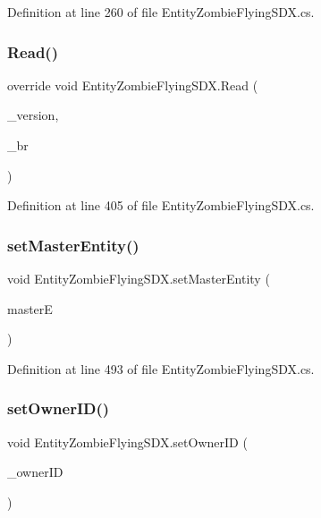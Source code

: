 Definition at line 260 of file Entity\+Zombie\+Flying\+S\+D\+X.\+cs.

\mbox{\label{class_entity_zombie_flying_s_d_x_a5af6bcdb5f8f464bce03a09d9ae0b1ce}} 
\subsubsection{\texorpdfstring{Read()}{Read()}}
{\footnotesize\ttfamily override void Entity\+Zombie\+Flying\+S\+D\+X.\+Read (\begin{DoxyParamCaption}\item[{byte}]{\+\_\+version,  }\item[{Binary\+Reader}]{\+\_\+br }\end{DoxyParamCaption})}



Definition at line 405 of file Entity\+Zombie\+Flying\+S\+D\+X.\+cs.

\mbox{\label{class_entity_zombie_flying_s_d_x_a2b3ea4b934e510141cdcab2986a024c0}} 
\subsubsection{\texorpdfstring{setMasterEntity()}{setMasterEntity()}}
{\footnotesize\ttfamily void Entity\+Zombie\+Flying\+S\+D\+X.\+set\+Master\+Entity (\begin{DoxyParamCaption}\item[{Entity\+Alive}]{masterE }\end{DoxyParamCaption})}



Definition at line 493 of file Entity\+Zombie\+Flying\+S\+D\+X.\+cs.

\mbox{\label{class_entity_zombie_flying_s_d_x_acdfec9186465aef955f58962e0763655}} 
\subsubsection{\texorpdfstring{setOwnerID()}{setOwnerID()}}
{\footnotesize\ttfamily void Entity\+Zombie\+Flying\+S\+D\+X.\+set\+Owner\+ID (\begin{DoxyParamCaption}\item[{int}]{\+\_\+owner\+ID }\end{DoxyParamCaption})}



